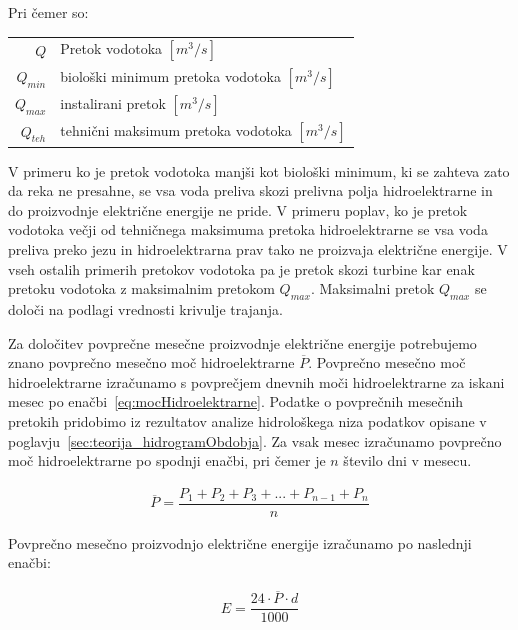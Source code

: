 Pri čemer so:
\begin{table}[htb!]
	\begin{tabular}{r|p{10cm}}
		$Q$ & Pretok vodotoka $\left[m^3/s \right]$\\
		$Q_{min}$ & biološki minimum pretoka vodotoka $\left[m^3/s \right]$ \\
		$Q_{max}$ & instalirani pretok $\left[m^3/s \right]$ \\
		$Q_{teh}$ & tehnični maksimum pretoka vodotoka $\left[m^3/s \right]$ \\
	\end{tabular}
\end{table}

V primeru ko je pretok vodotoka manjši kot biološki minimum, ki se zahteva zato da reka ne presahne, se vsa voda preliva skozi prelivna polja hidroelektrarne in do proizvodnje električne energije ne pride. V primeru poplav, ko je pretok vodotoka večji od tehničnega maksimuma pretoka hidroelektrarne se vsa voda preliva preko jezu in hidroelektrarna prav tako ne proizvaja električne energije. V vseh ostalih primerih pretokov vodotoka pa je pretok skozi turbine kar enak pretoku vodotoka z maksimalnim pretokom $Q_{max}$. Maksimalni pretok $Q_{max}$ se določi na podlagi vrednosti krivulje trajanja.



Za določitev povprečne mesečne proizvodnje električne energije potrebujemo znano povprečno mesečno moč hidroelektrarne  $\overline{P}$. Povprečno mesečno moč hidroelektrarne izračunamo s povprečjem dnevnih moči hidroelektrarne za iskani mesec po enačbi~\ref{eq:mocHidroelektrarne}. Podatke o povprečnih mesečnih pretokih pridobimo iz rezultatov analize hidrološkega niza podatkov opisane v poglavju~\ref{sec:teorija_hidrogramObdobja}. Za vsak mesec izračunamo povprečno moč hidroelektrarne po spodnji enačbi, pri čemer je $n$ število dni v mesecu. 



\begin{ceqn}
\begin{align}
\overline{P} = \dfrac{P_1 + P_2 + P_3 + ... + P_{n-1} + P_n}{n}
\end{align}
\end{ceqn}



Povprečno mesečno proizvodnjo električne energije izračunamo po naslednji enačbi:

\begin{ceqn}
\begin{align}
E = \dfrac{24 \cdot \overline{P} \cdot d}{1000}
\end{align}
\end{ceqn}

